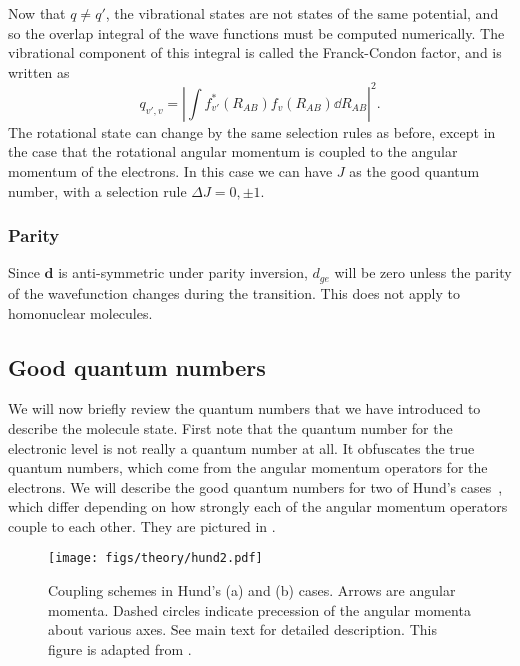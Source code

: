 Now that $q\neq q'$, the vibrational states are not states of the same
potential, and so the overlap integral of the wave functions must
be computed numerically. The vibrational component of this integral is called
the Franck-Condon factor, and is written as
%
\begin{equation}
  q_{v',v} = \left|\int f^*_{v'}(R_{AB})f_v(R_{AB})\dd R_{AB}\right|^2.
\end{equation}
%
The rotational state can change by the same selection rules as before, except
in the case that the rotational angular momentum is coupled to the angular
momentum of the electrons. In this case we can have $J$ as the good quantum
number, with a selection rule $\Delta J = 0, \pm1$.

\subsubsection{Parity}

Since $\mathbf{d}$ is anti-symmetric under parity inversion, $d_{ge}$ will be
zero unless the parity of the wavefunction changes during the transition. This
does not apply to homonuclear molecules. 

\subsection{Good quantum numbers}
\label{theory:qnos}

We will now briefly review the quantum numbers that we have introduced to
describe the molecule state. First note that the quantum number for the
electronic level is not really a quantum number at all. It obfuscates the true
quantum numbers, which come from the angular momentum operators for the
electrons. We will describe the good quantum numbers for two of Hund's
cases~\cite{brown_carrington_2003}, which differ depending on how strongly each
of the angular momentum operators couple to each other. They are pictured in
.

\begin{figure}
  \centering
  \texttt{[image: figs/theory/hund2.pdf]}
  \caption[Hund's cases]{
    Coupling schemes in Hund's (a) and (b) cases. Arrows are angular
    momenta. Dashed circles indicate precession of the angular momenta about
    various axes. See main text for detailed description. This figure is
    adapted from .
  }
  \label{theory:fig:hund}
\end{figure}


